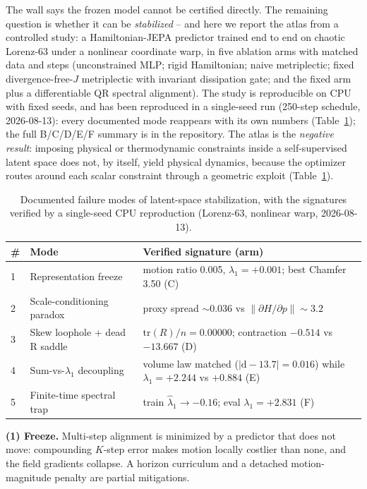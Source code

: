 \documentclass[11pt]{article}
\begin{document}
The wall says the frozen model cannot be certified directly. The remaining
question is whether it can be \emph{stabilized} -- and here we report the
atlas from a controlled study: a Hamiltonian-JEPA predictor trained end to
end on chaotic Lorenz-63 under a nonlinear coordinate warp, in five ablation
arms with matched data and steps (unconstrained MLP; rigid Hamiltonian;
naive metriplectic; fixed divergence-free-$J$ metriplectic with invariant
dissipation gate; and the fixed arm plus a differentiable QR spectral
alignment). The study is reproducible on CPU with fixed seeds, and has been
reproduced in a single-seed run (250-step schedule, 2026-08-13): every
documented mode reappears with its own numbers (Table~\ref{tab:atlas}); the
full B/C/D/E/F summary is in the repository. The atlas is
the \emph{negative result}: imposing physical or thermodynamic constraints
inside a self-supervised latent space does not, by itself, yield physical
dynamics, because the optimizer routes around each scalar constraint through
a geometric exploit (Table~\ref{tab:atlas}).

\begin{table}[t]
\centering
\caption{Documented failure modes of latent-space stabilization, with the
signatures verified by a single-seed CPU reproduction (Lorenz-63, nonlinear
warp, 2026-08-13).}
\label{tab:atlas}
\small
\begin{tabular}{@{}lll@{}}
\toprule
\# & Mode & Verified signature (arm) \\
\midrule
1 & Representation freeze &
  motion ratio 0.005, $\lambda_1=+0.001$; best Chamfer 3.50 (C) \\
2 & Scale-conditioning paradox &
  proxy spread $\sim0.036$ vs $\|\partial H/\partial p\| \sim 3.2$ \\
3 & Skew loophole + dead R saddle &
  $\mathrm{tr}(R)/n = 0.00000$; contraction $-0.514$ vs $-13.667$ (D) \\
4 & Sum-vs-$\lambda_1$ decoupling &
  volume law matched ($|\mathrm{d}{-}13.7|=0.016$) while
  $\lambda_1=+2.244$ vs $+0.884$ (E) \\
5 & Finite-time spectral trap &
  train $\hat\lambda_1 \to -0.16$; eval $\lambda_1 = +2.831$ (F) \\
\bottomrule
\end{tabular}
\end{table}

\textbf{(1) Freeze.} Multi-step alignment is minimized by a predictor that
does not move: compounding $K$-step error makes motion locally costlier than
none, and the field gradients collapse. A horizon curriculum and a detached
motion-magnitude penalty are partial mitigations.
\end{document}

